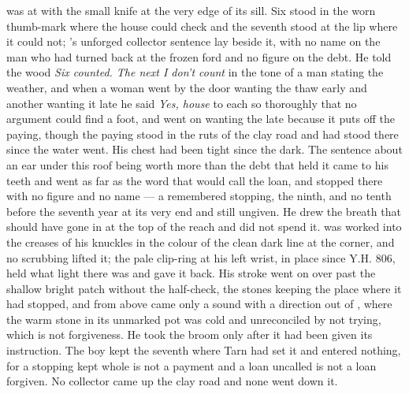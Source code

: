\scenebreak

 was at  with the small knife at the very edge of its sill. Six stood in the worn thumb-mark where the house could check and the seventh stood at the lip where it could not; 's unforged collector sentence lay beside it, with no name on the man who had turned back at the frozen ford and no figure on the debt. He told the wood \emph{Six counted. The next I don't count} in the tone of a man stating the weather, and when a woman went by the door wanting the thaw early and another wanting it late he said \emph{Yes, house} to each so thoroughly that no argument could find a foot, and went on wanting the late because it puts off the paying, though the paying stood in the ruts of the clay road and had stood there since the water went. His chest had been tight since the dark. The sentence about an ear under this roof being worth more than the debt that held it came to his teeth and went as far as the word that would call the loan, and stopped there with no figure and no name --- a remembered stopping, the ninth, and no tenth before the seventh year at its very end and still ungiven. He drew the breath that should have gone in at the top of the reach and did not spend it.  was worked into the creases of his knuckles in the colour of the clean dark line at the corner, and no scrubbing lifted it; the pale clip-ring at his left wrist, in place since Y.H. 806, held what light there was and gave it back. His stroke went on over  past the shallow bright patch without the half-check, the stones keeping the place where it had stopped, and from above came only a sound with a direction out of , where the warm stone in its unmarked pot was cold and unreconciled by not trying, which is not forgiveness. He took the broom only after it had been given its instruction. The boy kept the seventh where Tarn had set it and entered nothing, for a stopping kept whole is not a payment and a loan uncalled is not a loan forgiven. No collector came up the clay road and none went down it.

